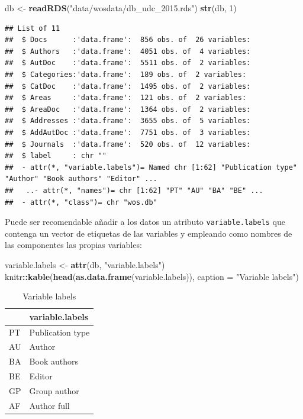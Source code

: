 \documentclass[
]{book}
\newenvironment{Shaded}{\begin{snugshade}}{\end{snugshade}}
\newcommand{\AttributeTok}[1]{\textcolor[rgb]{0.13,0.29,0.53}{#1}}
\newcommand{\DecValTok}[1]{\textcolor[rgb]{0.00,0.00,0.81}{#1}}
\newcommand{\FunctionTok}[1]{\textcolor[rgb]{0.13,0.29,0.53}{\textbf{#1}}}
\newcommand{\NormalTok}[1]{#1}
\newcommand{\OtherTok}[1]{\textcolor[rgb]{0.56,0.35,0.01}{#1}}
\newcommand{\SpecialCharTok}[1]{\textcolor[rgb]{0.81,0.36,0.00}{\textbf{#1}}}
\newcommand{\StringTok}[1]{\textcolor[rgb]{0.31,0.60,0.02}{#1}}
\theoremstyle{break}
\theoremstyle{nonumberplain}
\begin{document}
\begin{Shaded}
\begin{Highlighting}[]
\NormalTok{db }\OtherTok{\textless{}{-}} \FunctionTok{readRDS}\NormalTok{(}\StringTok{"data/wosdata/db\_udc\_2015.rds"}\NormalTok{)}
\FunctionTok{str}\NormalTok{(db, }\DecValTok{1}\NormalTok{)}
\end{Highlighting}
\end{Shaded}

\begin{verbatim}
## List of 11
##  $ Docs      :'data.frame':  856 obs. of  26 variables:
##  $ Authors   :'data.frame':  4051 obs. of  4 variables:
##  $ AutDoc    :'data.frame':  5511 obs. of  2 variables:
##  $ Categories:'data.frame':  189 obs. of  2 variables:
##  $ CatDoc    :'data.frame':  1495 obs. of  2 variables:
##  $ Areas     :'data.frame':  121 obs. of  2 variables:
##  $ AreaDoc   :'data.frame':  1364 obs. of  2 variables:
##  $ Addresses :'data.frame':  3655 obs. of  5 variables:
##  $ AddAutDoc :'data.frame':  7751 obs. of  3 variables:
##  $ Journals  :'data.frame':  520 obs. of  12 variables:
##  $ label     : chr ""
##  - attr(*, "variable.labels")= Named chr [1:62] "Publication type" "Author" "Book authors" "Editor" ...
##   ..- attr(*, "names")= chr [1:62] "PT" "AU" "BA" "BE" ...
##  - attr(*, "class")= chr "wos.db"
\end{verbatim}

Puede ser recomendable añadir a los datos un atributo \texttt{variable.labels} que
contenga un vector de etiquetas de las variables y empleando como nombres de
las componentes las propias variables:

\begin{Shaded}
\begin{Highlighting}[]
\NormalTok{variable.labels }\OtherTok{\textless{}{-}} \FunctionTok{attr}\NormalTok{(db, }\StringTok{"variable.labels"}\NormalTok{)}
\NormalTok{knitr}\SpecialCharTok{::}\FunctionTok{kable}\NormalTok{(}\FunctionTok{head}\NormalTok{(}\FunctionTok{as.data.frame}\NormalTok{(variable.labels)),}
             \AttributeTok{caption =} \StringTok{"Variable labels"}\NormalTok{)}
\end{Highlighting}
\end{Shaded}

\begin{table}

\caption{\label{tab:unnamed-chunk-70}Variable labels}
\centering
\begin{tabular}[t]{l|l}
\hline
  & variable.labels\\
\hline
PT & Publication type\\
\hline
AU & Author\\
\hline
BA & Book authors\\
\hline
BE & Editor\\
\hline
GP & Group author\\
\hline
AF & Author full\\
\hline
\end{tabular}
\end{table}
\end{document}
